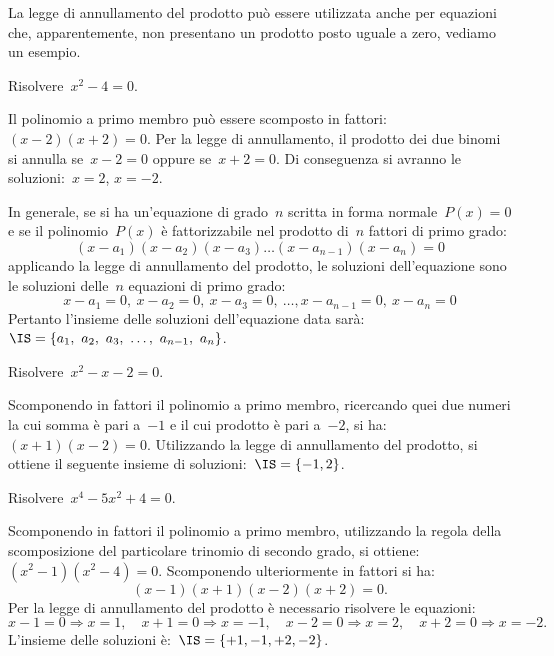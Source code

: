 La legge di annullamento del prodotto può essere utilizzata anche per 
equazioni che, apparentemente, non presentano un prodotto posto uguale a zero, 
vediamo un esempio.

 \begin{esempio}
Risolvere~$x^{2}-4=0$.

Il polinomio a primo membro può essere scomposto in fattori:~$(x-2)(x+2)=0$.
Per la legge di annullamento, il prodotto dei due binomi si annulla se~$x-2=0$ 
oppure se~$x+2=0$.
Di conseguenza si avranno le soluzioni:~$x=2$, $x=-2$.
 \end{esempio}

In generale, se si ha un'equazione di grado~$n$ scritta in forma 
normale~$P(x)=0$ e se il polinomio~$P(x)$ è fattorizzabile nel prodotto 
di~$n$ fattori di primo grado:
\[(x-a_{1})(x-a_{2})(x-a_{3})\ldots (x-a_{n-1})(x-a_{n})=0\]
applicando la legge di annullamento del prodotto, le soluzioni dell'equazione 
sono le soluzioni delle~$n$ equazioni di primo grado:
\[x-a_{1}=0,~x-a_{2}=0,~x-a_{3}=0,~\ldots, x-a_{n-1}=0,~x-a_{n}=0\]
Pertanto l'insieme delle soluzioni dell'equazione data 
sarà:~$\IS=\{a_{1},~a_{2},~a_{3},~\ldots,~a_{n-1},~a_{n}\}$.

 \begin{esempio}
Risolvere~$x^{2}-x-2=0$.

Scomponendo in fattori il polinomio a primo membro, ricercando quei due numeri 
la cui somma è pari a~$-1$ e il cui prodotto è pari a~$-2$, 
si ha:~$(x+1)(x-2)=0$.
Utilizzando la legge di annullamento del prodotto, si ottiene il seguente 
insieme di soluzioni:~$\IS=\{-1,2\}$.
 \end{esempio}

 \begin{esempio}
Risolvere~$x^{4}-5x^{2}+4=0$.

Scomponendo in fattori il polinomio a primo membro, utilizzando la regola 
della scomposizione del particolare trinomio di secondo grado, si 
ottiene:~$(x^{2}-1)(x^{2}-4)=0$. Scomponendo ulteriormente in fattori si ha:
\begin{equation*}
(x-1)(x+1)(x-2)(x+2)=0.
\end{equation*}
Per la legge di annullamento del prodotto è necessario risolvere le equazioni:
\begin{equation*}
x-1=0 \Rightarrow x=1, \quad x+1=0 \Rightarrow x=-1,\quad 
x-2=0 \Rightarrow x=2, \quad x+2=0 \Rightarrow x=-2.
\end{equation*}
L'insieme delle soluzioni è:~$\IS=\{+1,-1,+2,-2\}$.
 \end{esempio}

